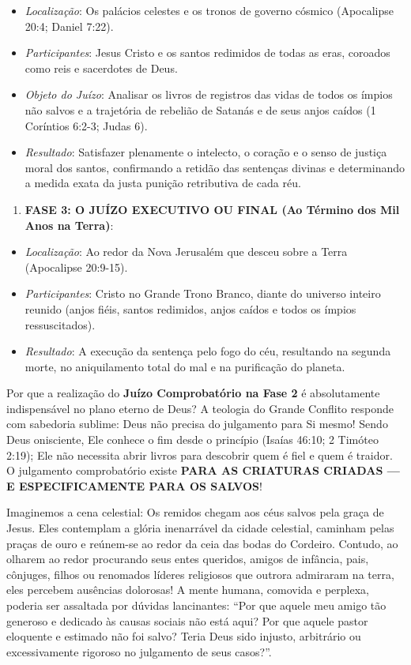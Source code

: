 \begin{itemize}
  \item \textit{Localização}: Os palácios celestes e os tronos de governo cósmico (Apocalipse 20:4; Daniel 7:22).
  \item \textit{Participantes}: Jesus Cristo e os santos redimidos de todas as eras, coroados como reis e sacerdotes de Deus.
  \item \textit{Objeto do Juízo}: Analisar os livros de registros das vidas de todos os ímpios não salvos e a trajetória de rebelião de Satanás e de seus anjos caídos (1 Coríntios 6:2-3; Judas 6).
  \item \textit{Resultado}: Satisfazer plenamente o intelecto, o coração e o senso de justiça moral dos santos, confirmando a retidão das sentenças divinas e determinando a medida exata da justa punição retributiva de cada réu.
\end{itemize}


\begin{enumerate}
  \item \textbf{FASE 3: O JUÍZO EXECUTIVO OU FINAL (Ao Término dos Mil Anos na Terra)}:
\end{enumerate}

\begin{itemize}
  \item \textit{Localização}: Ao redor da Nova Jerusalém que desceu sobre a Terra (Apocalipse 20:9-15).
  \item \textit{Participantes}: Cristo no Grande Trono Branco, diante do universo inteiro reunido (anjos fiéis, santos redimidos, anjos caídos e todos os ímpios ressuscitados).
  \item \textit{Resultado}: A execução da sentença pelo fogo do céu, resultando na segunda morte, no aniquilamento total do mal e na purificação do planeta.
\end{itemize}


Por que a realização do \textbf{Juízo Comprobatório na Fase 2} é absolutamente indispensável no plano eterno de Deus?
A teologia do Grande Conflito responde com sabedoria sublime: Deus não precisa do julgamento para Si mesmo! Sendo Deus onisciente, Ele conhece o fim desde o princípio (Isaías 46:10; 2 Timóteo 2:19); Ele não necessita abrir livros para descobrir quem é fiel e quem é traidor.
O julgamento comprobatório existe \textbf{PARA AS CRIATURAS CRIADAS — E ESPECIFICAMENTE PARA OS SALVOS}!

Imaginemos a cena celestial: Os remidos chegam aos céus salvos pela graça de Jesus. Eles contemplam a glória inenarrável da cidade celestial, caminham pelas praças de ouro e reúnem-se ao redor da ceia das bodas do Cordeiro. Contudo, ao olharem ao redor procurando seus entes queridos, amigos de infância, pais, cônjuges, filhos ou renomados líderes religiosos que outrora admiraram na terra, eles percebem ausências dolorosas!
A mente humana, comovida e perplexa, poderia ser assaltada por dúvidas lancinantes: ``Por que aquele meu amigo tão generoso e dedicado às causas sociais não está aqui? Por que aquele pastor eloquente e estimado não foi salvo? Teria Deus sido injusto, arbitrário ou excessivamente rigoroso no julgamento de seus casos?''.

